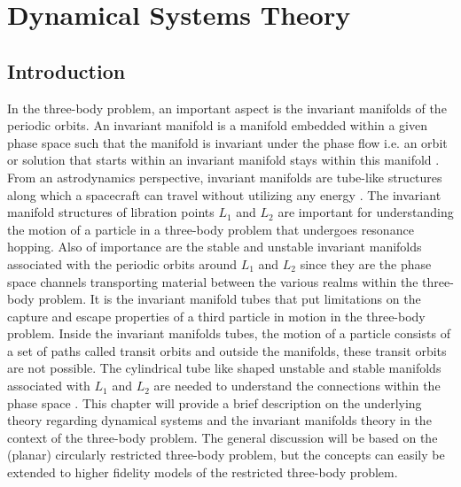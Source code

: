 \chapter{Dynamical Systems Theory}
\label{DST}
\graphicspath{{chapter-8/Images/}}

\section{Introduction}
In the three-body problem, an important aspect is the invariant manifolds of the periodic orbits. An invariant manifold is a manifold embedded within a given phase space such that the manifold is invariant under the phase flow i.e. an orbit or solution that starts within an invariant manifold stays within this manifold \cite{nlde_book}. From an astrodynamics perspective, invariant manifolds are tube-like structures along which a spacecraft can travel without utilizing any energy \cite{moore2009_invariant}. The invariant manifold structures of libration points $L_1$ and $L_2$ are important for understanding the motion of a particle in a three-body problem that undergoes resonance hopping. Also of importance are the stable and unstable invariant manifolds associated with the periodic orbits around $L_1$ and $L_2$ since they are the phase space channels transporting material between the various realms within the three-body problem. It is the invariant manifold tubes that put limitations on the capture and escape properties of a third particle in motion in the three-body problem. Inside the invariant manifolds tubes, the motion of a particle consists of a set of paths called transit orbits and outside the manifolds, these transit orbits are not possible. The cylindrical tube like shaped unstable and stable manifolds associated with $L_1$ and $L_2$ are needed to understand the connections within the phase space \cite{invariant}. This chapter will provide a brief description on the underlying theory regarding dynamical systems and the invariant manifolds theory in the context of the three-body problem. The general discussion will be based on the (planar) circularly restricted three-body problem, but the concepts can easily be extended to higher fidelity models of the restricted three-body problem.

